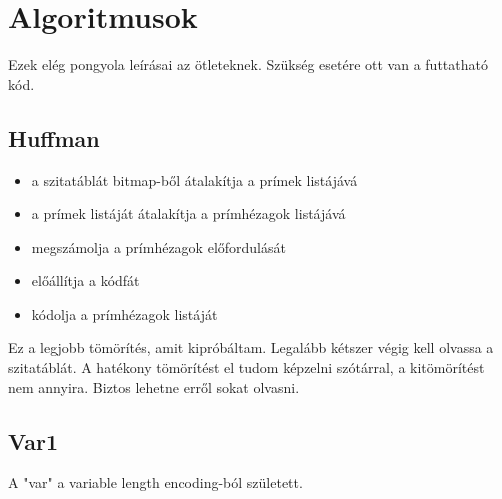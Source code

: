 \documentclass{article}
\begin{document}
\section{Algoritmusok}

Ezek elég pongyola leírásai az ötleteknek. Szükség esetére ott van a futtatható kód.

\subsection{Huffman}

\begin{itemize}
\item a szitatáblát bitmap-ből átalakítja a prímek listájává
\item a prímek listáját átalakítja a prímhézagok listájává
\item megszámolja a prímhézagok előfordulását
\item előállítja a kódfát
\item kódolja a prímhézagok listáját
\end{itemize}

Ez a legjobb tömörítés, amit kipróbáltam. Legalább kétszer végig kell olvassa a szitatáblát. A hatékony tömörítést el tudom képzelni szótárral, a kitömörítést nem annyira. Biztos lehetne erről sokat olvasni.

\subsection{Var1}

A "var" a variable length encoding-ból született.
\end{document}
